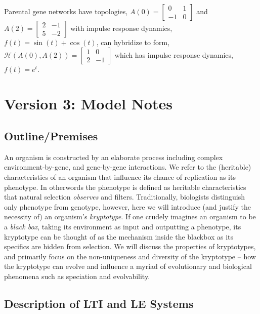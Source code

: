 \documentclass[11 pt]{article}
\newcommand{\1}{\mathbbm{1}}
\begin{document}
      Parental gene networks have topologies,
      $A(0) =\left[\begin{matrix}
      0 & 1 \\
      -1 & 0
    \end{matrix}\right]$
     and
    $A(2) = \left[\begin{matrix}
      2 & -1 \\
      5 & -2
    \end{matrix}\right]$ with impulse response dynamics, $f(t) = \sin(t) + \cos(t)$, can hybridize to form,
     $\mathcal{H}\left( A(0), A(2) \right) = \left[\begin{matrix}
      1 & 0 \\
      2 & -1
     \end{matrix}\right]$ which has impulse response dynamics, $f(t) = e^{t}$.


     \section{Version 3: Model Notes}

     \subsection{Outline/Premises}

      An organism is constructed by an elaborate process including complex environment-by-gene, and gene-by-gene interactions. We refer to the (heritable) characteristics of an organism that influence its chance of replication as its phenotype. In otherwords the phenotype is defined as heritable characteristics that natural selection \emph{observes} and filters. Traditionally, biologists distinguish only phenotype from genotype, however, here we will introduce (and justify the necessity of) an organism's \emph{kryptotype}. If one crudely imagines an organism to be a \emph{black box}, taking its environment as input and outputting a phenotype, its kryptotype can be thought of as the mechanism inside the blackbox as its specifics are hidden from selection. We will discuss the properties of kryptotypes, and primarily focus on the non-uniqueness and diversity of the kryptotype -- how the kryptotype can evolve and influence a myriad of evolutionary and biological phenomena such as speciation and evolvability.

     \subsection{Description of LTI and LE Systems}
\end{document}
